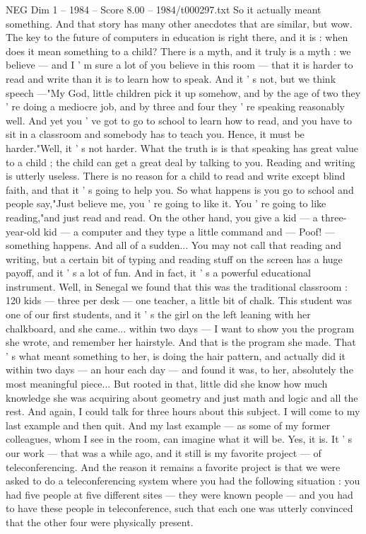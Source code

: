 \begin{textsample}{NEG Dim 1 – 1984 – Score 8.00 – 1984/t000297.txt}
So it actually meant something.
And that story has many other anecdotes that are similar, but wow.
The key to the future of computers in education is right there, and it is : when does it mean something to a child?
There is a myth, and it truly is a myth : we believe — and I ' m sure a lot of you believe in this room — that it is harder to read and write than it is to learn how to speak.
And it ' s not, but we think speech —"My God, little children pick it up somehow, and by the age of two they ' re doing a mediocre job, and by three and four they ' re speaking reasonably well.
And yet you ' ve got to go to school to learn how to read, and you have to sit in a classroom and somebody has to teach you.
Hence, it must be harder."Well, it ' s not harder.
What the truth is is that speaking has great value to a child ; the child can get a great deal by talking to you.
Reading and writing is utterly useless.
There is no reason for a child to read and write except blind faith, and that it ' s going to help you.
So what happens is you go to school and people say,"Just believe me, you ' re going to like it.
You ' re going to like reading,"and just read and read.
On the other hand, you give a kid — a three-year-old kid — a computer and they type a little command and — Poof! — something happens.
And all of a sudden...
You may not call that reading and writing, but a certain bit of typing and reading stuff on the screen has a huge payoff, and it ' s a lot of fun.
And in fact, it ' s a powerful educational instrument.
Well, in Senegal we found that this was the traditional classroom : 120 kids — three per desk — one teacher, a little bit of chalk.
This student was one of our first students, and it ' s the girl on the left leaning with her chalkboard, and she came... within two days — I want to show you the program she wrote, and remember her hairstyle.
And that is the program she made.
That ' s what meant something to her, is doing the hair pattern, and actually did it within two days — an hour each day — and found it was, to her, absolutely the most meaningful piece...
But rooted in that, little did she know how much knowledge she was acquiring about geometry and just math and logic and all the rest.
And again, I could talk for three hours about this subject.
I will come to my last example and then quit.
And my last example — as some of my former colleagues, whom I see in the room, can imagine what it will be.
Yes, it is.
It ' s our work — that was a while ago, and it still is my favorite project — of teleconferencing.
And the reason it remains a favorite project is that we were asked to do a teleconferencing system where you had the following situation : you had five people at five different sites — they were known people — and you had to have these people in teleconference, such that each one was utterly convinced that the other four were physically present.

\end{textsample}
